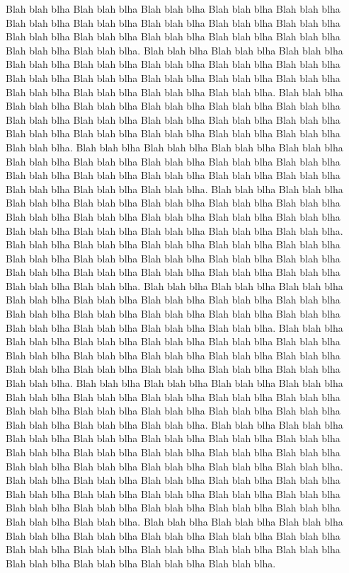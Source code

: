 \documentclass[landscape,twocolumn,a4]{article}
\begin{document}
Blah blah blha Blah blah blha Blah blah blha Blah blah blha Blah blah blha
Blah blah blha Blah blah blha Blah blah blha Blah blah blha Blah blah blha
Blah blah blha Blah blah blha Blah blah blha Blah blah blha Blah blah blha
Blah blah blha Blah blah blha.
Blah blah blha Blah blah blha Blah blah blha Blah blah blha Blah blah blha
Blah blah blha Blah blah blha Blah blah blha Blah blah blha Blah blah blha
Blah blah blha Blah blah blha Blah blah blha Blah blah blha Blah blah blha
Blah blah blha Blah blah blha.
Blah blah blha Blah blah blha Blah blah blha Blah blah blha Blah blah blha
Blah blah blha Blah blah blha Blah blah blha Blah blah blha Blah blah blha
Blah blah blha Blah blah blha Blah blah blha Blah blah blha Blah blah blha
Blah blah blha Blah blah blha.
Blah blah blha Blah blah blha Blah blah blha Blah blah blha Blah blah blha
Blah blah blha Blah blah blha Blah blah blha Blah blah blha Blah blah blha
Blah blah blha Blah blah blha Blah blah blha Blah blah blha Blah blah blha
Blah blah blha Blah blah blha.
Blah blah blha Blah blah blha Blah blah blha Blah blah blha Blah blah blha
Blah blah blha Blah blah blha Blah blah blha Blah blah blha Blah blah blha
Blah blah blha Blah blah blha Blah blah blha Blah blah blha Blah blah blha
Blah blah blha Blah blah blha.
Blah blah blha Blah blah blha Blah blah blha Blah blah blha Blah blah blha
Blah blah blha Blah blah blha Blah blah blha Blah blah blha Blah blah blha
Blah blah blha Blah blah blha Blah blah blha Blah blah blha Blah blah blha
Blah blah blha Blah blah blha.
Blah blah blha Blah blah blha Blah blah blha Blah blah blha Blah blah blha
Blah blah blha Blah blah blha Blah blah blha Blah blah blha Blah blah blha
Blah blah blha Blah blah blha Blah blah blha Blah blah blha Blah blah blha
Blah blah blha Blah blah blha.
Blah blah blha Blah blah blha Blah blah blha Blah blah blha Blah blah blha
Blah blah blha Blah blah blha Blah blah blha Blah blah blha Blah blah blha
Blah blah blha Blah blah blha Blah blah blha Blah blah blha Blah blah blha
Blah blah blha Blah blah blha.
Blah blah blha Blah blah blha Blah blah blha Blah blah blha Blah blah blha
Blah blah blha Blah blah blha Blah blah blha Blah blah blha Blah blah blha
Blah blah blha Blah blah blha Blah blah blha Blah blah blha Blah blah blha
Blah blah blha Blah blah blha.
Blah blah blha Blah blah blha Blah blah blha Blah blah blha Blah blah blha
Blah blah blha Blah blah blha Blah blah blha Blah blah blha Blah blah blha
Blah blah blha Blah blah blha Blah blah blha Blah blah blha Blah blah blha
Blah blah blha Blah blah blha.
Blah blah blha Blah blah blha Blah blah blha Blah blah blha Blah blah blha
Blah blah blha Blah blah blha Blah blah blha Blah blah blha Blah blah blha
Blah blah blha Blah blah blha Blah blah blha Blah blah blha Blah blah blha
Blah blah blha Blah blah blha.
Blah blah blha Blah blah blha Blah blah blha Blah blah blha Blah blah blha
Blah blah blha Blah blah blha Blah blah blha Blah blah blha Blah blah blha
Blah blah blha Blah blah blha Blah blah blha Blah blah blha Blah blah blha
Blah blah blha Blah blah blha.
\end{document}
